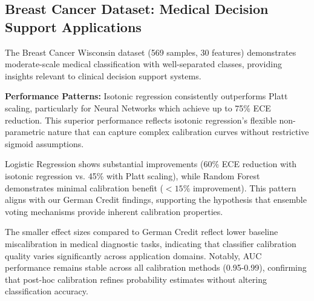 \documentclass[12pt, a4paper]{article}
\begin{document}
\subsection{Breast Cancer Dataset: Medical Decision Support Applications}\label{sec:BreastCancerResults}

The Breast Cancer Wisconsin dataset (569 samples, 30 features) demonstrates moderate-scale medical classification with well-separated classes, providing insights relevant to clinical decision support systems.

\textbf{Performance Patterns:} Isotonic regression consistently outperforms Platt scaling, particularly for Neural Networks which achieve up to 75\% ECE reduction. This superior performance reflects isotonic regression's flexible non-parametric nature that can capture complex calibration curves without restrictive sigmoid assumptions.

Logistic Regression shows substantial improvements (60\% ECE reduction with isotonic regression vs. 45\% with Platt scaling), while Random Forest demonstrates minimal calibration benefit ($<15\%$ improvement). This pattern aligns with our German Credit findings, supporting the hypothesis that ensemble voting mechanisms provide inherent calibration properties.

The smaller effect sizes compared to German Credit reflect lower baseline miscalibration in medical diagnostic tasks, indicating that classifier calibration quality varies significantly across application domains. Notably, AUC performance remains stable across all calibration methods (0.95-0.99), confirming that post-hoc calibration refines probability estimates without altering classification accuracy.
\end{document}
